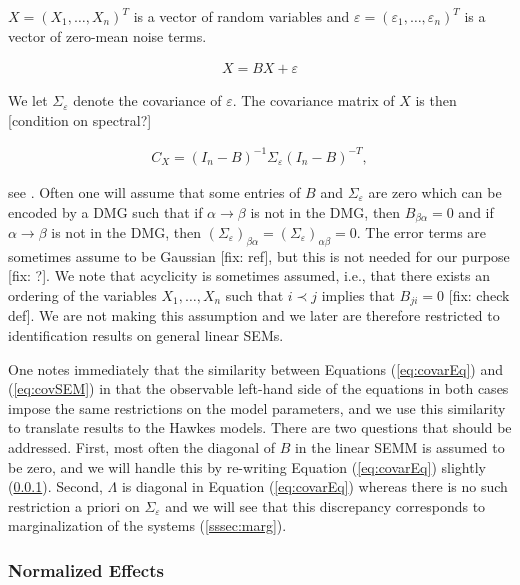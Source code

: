 \documentclass[accepted]{uai2021} %
\begin{document}
$X = (X_1,\ldots,X_n)^T$ is a vector of random variables and $\varepsilon = 
(\varepsilon_1,\ldots,\varepsilon_n)^T$ is a vector of zero-mean noise terms.

\begin{align}
	X = BX + \varepsilon
	\label{eq:SEM}
\end{align}

We let $\Sigma_\varepsilon$ denote the covariance of $\varepsilon$. The 
covariance matrix of $X$ is then [condition on spectral?]

\begin{align}
C_X = (I_n - B)^{-1}\Sigma_\varepsilon (I_n - B)^{-T},
\label{eq:covSEM}
\end{align}

see \cite{hyttinen2012}. Often one will assume that some entries of $B$ and 
$\Sigma_\varepsilon$ are zero which can be encoded by a DMG such that if 
$\alpha \rightarrow \beta$ is not in the DMG, then $B_{\beta\alpha} = 0$ and if 
$\alpha\rightarrow\beta$ is not in the DMG, then 
$(\Sigma_\varepsilon)_{\beta\alpha} = (\Sigma_\varepsilon)_{\alpha\beta} = 0$. 
The 
error terms are sometimes assume to be Gaussian [fix: ref], but this is not 
needed for our purpose [fix: ?]. We note that acyclicity is sometimes assumed, 
i.e., that there exists an ordering of the variables $X_1,\ldots, X_n$ such 
that $i \prec j$ implies that $B_{ji} = 0$ [fix: check def]. We are not making 
this assumption and we later are therefore restricted to identification results 
on general linear SEMs.

One notes immediately that the similarity between Equations (\ref{eq:covarEq}) 
and (\ref{eq:covSEM}) in that the observable left-hand side of the equations in 
both cases impose the same restrictions on the model parameters, and we use 
this similarity to translate results to the Hawkes models. There are two 
questions that should be addressed. First, most often the diagonal of $B$ in 
the linear SEMM is assumed to be zero, and we will handle this by re-writing 
Equation (\ref{eq:covarEq}) slightly (\ref{sssec:normEff}). Second, $\Lambda$ 
is diagonal in Equation (\ref{eq:covarEq}) whereas there is no such restriction 
a priori on $\Sigma_\varepsilon$ and we will see that this discrepancy 
corresponds to marginalization of the systems (\ref{sssec:marg}).


\subsubsection{Normalized Effects}
\label{sssec:normEff}
\end{document}
